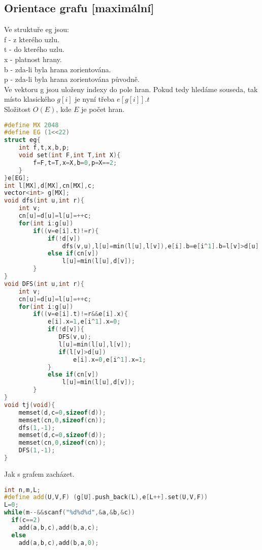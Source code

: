 \documentclass[11pt]{article}
\begin{document}
\subsection{Orientace grafu [maximální]}
Ve struktuře \textsf{eg} jsou: 
\\\textsf{f} - z kterého uzlu.
\\\textsf{t} - do kterého uzlu.
\\\textsf{x} - platnost hrany.
\\\textsf{b} - zda-li byla hrana zorientována.
\\\textsf{p} - zda-li byla hrana zorientována původně.
\\Ve vektoru \textsf{g} jsou uloženy indexy do pole hran. Pokud tedy hledáme souseda, tak místo klasického $g[i]$ je nyní třeba $e[g[i]].t$
\\Složitost $O(E)$, kde $E$ je počet hran.
\begin{lstlisting}[language=C++]
#define MX 2048
#define EG (1<<22)
struct eg{  
    int f,t,x,b,p;
    void set(int F,int T,int X){
        f=F,t=T,x=X,b=0,p=X==2;
    }
}e[EG];  
int l[MX],d[MX],cn[MX],c;
vector<int> g[MX];
void dfs(int u,int r){
    int v;
    cn[u]=d[u]=l[u]=++c;  
    for(int i:g[u])  
        if((v=e[i].t)!=r){
            if(!d[v])
                dfs(v,u),l[u]=min(l[u],l[v]),e[i].b=e[i^1].b=l[v]>d[u];
            else if(cn[v]) 
                l[u]=min(l[u],d[v]);  
        }  
}  
void DFS(int u,int r){
    int v;
    cn[u]=d[u]=l[u]=++c;  
    for(int i:g[u])
        if((v=e[i].t)!=r&&e[i].x){
            e[i].x=1,e[i^1].x=0;  
            if(!d[v]){  
               DFS(v,u);  
               l[u]=min(l[u],l[v]);  
               if(l[v]>d[u])  
                   e[i].x=0,e[i^1].x=1;  
            }
            else if(cn[v])
                l[u]=min(l[u],d[v]);
        }
}
void tj(void){  
    memset(d,c=0,sizeof(d));  
    memset(cn,0,sizeof(cn));
    dfs(1,-1);
    memset(d,c=0,sizeof(d));  
    memset(cn,0,sizeof(cn));
    DFS(1,-1);
}
\end{lstlisting}
\begin{center}
Jak s grafem zacházet.
\end{center}
\begin{lstlisting}[language=C++]
int n,m,L;  
#define add(U,V,F) (g[U].push_back(L),e[L++].set(U,V,F))
L=0;
while(m--&&scanf("%d%d%d",&a,&b,&c))
  if(c==2)
    add(a,b,c),add(b,a,c);  
  else
    add(a,b,c),add(b,a,0);  

\end{lstlisting}
\end{document}
